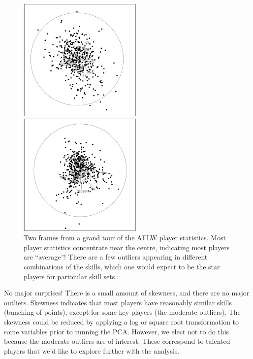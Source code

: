 \documentclass[
  letterpaper,
]{krantz}
\begin{document}
\begin{figure}

\begin{minipage}{0.50\linewidth}
\includegraphics[width=2.375in,height=\textheight]{images/aflw_gt_70.png}\end{minipage}%
%
\begin{minipage}{0.50\linewidth}
\includegraphics[width=2.375in,height=\textheight]{images/aflw_gt_329.png}\end{minipage}%

\caption{\label{fig-aflw-gt-pdf}Two frames from a grand tour of the AFLW
player statistics. Most player statistics concentrate near the centre,
indicating most players are ``average''! There are a few outliers
appearing in different combinations of the skills, which one would
expect to be the star players for particular skill sets.
}

\end{figure}%

No major surprises! There is a small amount of skewness, and there are
no major outliers. Skewness indicates that most players have reasonably
similar skills (bunching of points), except for some key players (the
moderate outliers). The skewness could be reduced by applying a log or
square root transformation to some variables prior to running the PCA.
However, we elect not to do this because the moderate outliers are of
interest. These correspond to talented players that we'd like to explore
further with the analysis.
\end{document}
